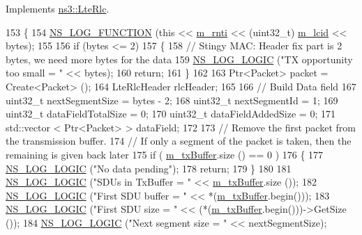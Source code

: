 Implements \hyperlink{classns3_1_1LteRlc_aee0c0620f4f1cd04fa08c78438cb3529}{ns3\+::\+Lte\+Rlc}.


\begin{DoxyCode}
153 \{
154   \hyperlink{log-macros-disabled_8h_a90b90d5bad1f39cb1b64923ea94c0761}{NS\_LOG\_FUNCTION} (\textcolor{keyword}{this} << \hyperlink{classns3_1_1LteRlc_a48ab0a78e7f2687337075b1c8832df70}{m\_rnti} << (uint32\_t) \hyperlink{classns3_1_1LteRlc_a051085e9b27883e7ba4b98ad7242fd8a}{m\_lcid} << bytes);
155 
156   \textcolor{keywordflow}{if} (bytes <= 2)
157     \{
158       \textcolor{comment}{// Stingy MAC: Header fix part is 2 bytes, we need more bytes for the data}
159       \hyperlink{group__logging_ga88acd260151caf2db9c0fc84997f45ce}{NS\_LOG\_LOGIC} (\textcolor{stringliteral}{"TX opportunity too small = "} << bytes);
160       \textcolor{keywordflow}{return};
161     \}
162 
163   Ptr<Packet> packet = Create<Packet> ();
164   LteRlcHeader rlcHeader;
165 
166   \textcolor{comment}{// Build Data field}
167   uint32\_t nextSegmentSize = bytes - 2;
168   uint32\_t nextSegmentId = 1;
169   uint32\_t dataFieldTotalSize = 0;
170   uint32\_t dataFieldAddedSize = 0;
171   std::vector < Ptr<Packet> > dataField;
172 
173   \textcolor{comment}{// Remove the first packet from the transmission buffer.}
174   \textcolor{comment}{// If only a segment of the packet is taken, then the remaining is given back later}
175   \textcolor{keywordflow}{if} ( \hyperlink{classns3_1_1LteRlcUm_ac2c10aa57585dbea3797d651f3dce7be}{m\_txBuffer}.size () == 0 )
176     \{
177       \hyperlink{group__logging_ga88acd260151caf2db9c0fc84997f45ce}{NS\_LOG\_LOGIC} (\textcolor{stringliteral}{"No data pending"});
178       \textcolor{keywordflow}{return};
179     \}
180 
181   \hyperlink{group__logging_ga88acd260151caf2db9c0fc84997f45ce}{NS\_LOG\_LOGIC} (\textcolor{stringliteral}{"SDUs in TxBuffer  = "} << \hyperlink{classns3_1_1LteRlcUm_ac2c10aa57585dbea3797d651f3dce7be}{m\_txBuffer}.size ());
182   \hyperlink{group__logging_ga88acd260151caf2db9c0fc84997f45ce}{NS\_LOG\_LOGIC} (\textcolor{stringliteral}{"First SDU buffer  = "} << *(\hyperlink{classns3_1_1LteRlcUm_ac2c10aa57585dbea3797d651f3dce7be}{m\_txBuffer}.begin()));
183   \hyperlink{group__logging_ga88acd260151caf2db9c0fc84997f45ce}{NS\_LOG\_LOGIC} (\textcolor{stringliteral}{"First SDU size    = "} << (*(\hyperlink{classns3_1_1LteRlcUm_ac2c10aa57585dbea3797d651f3dce7be}{m\_txBuffer}.begin()))->GetSize ());
184   \hyperlink{group__logging_ga88acd260151caf2db9c0fc84997f45ce}{NS\_LOG\_LOGIC} (\textcolor{stringliteral}{"Next segment size = "} << nextSegmentSize);

\end{DoxyCode}
